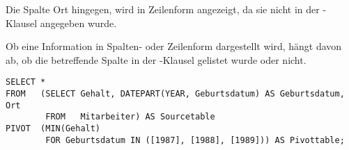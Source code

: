           Die Spalte Ort hingegen, wird in Zeilenform angezeigt, da sie nicht in der -Klausel angegeben wurde.
          \begin{merke}
            Ob eine Information in Spalten- oder Zeilenform dargestellt wird, h\"angt davon ab, ob die betreffende Spalte in der -Klausel gelistet wurde oder nicht.
          \end{merke}
\clearpage
          \begin{lstlisting}[language=ms_sql,caption={Zus\"atzliche Gruppierungen in einer Pivot-Abfrage},label=sql06_26]
SELECT *
FROM   (SELECT Gehalt, DATEPART(YEAR, Geburtsdatum) AS Geburtsdatum, Ort
        FROM   Mitarbeiter) AS Sourcetable
PIVOT  (MIN(Gehalt)
        FOR Geburtsdatum IN ([1987], [1988], [1989])) AS Pivottable;
          \end{lstlisting}
